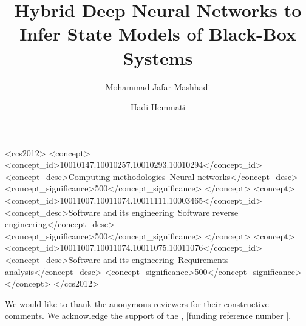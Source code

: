 \documentclass[sigconf]{acmart}
\begin{document}
\title{Hybrid Deep Neural Networks to Infer State Models of Black-Box Systems}

\author{Mohammad Jafar Mashhadi}

\author{Hadi Hemmati}


\begin{CCSXML}
<ccs2012>
   <concept>
       <concept_id>10010147.10010257.10010293.10010294</concept_id>
       <concept_desc>Computing methodologies~Neural networks</concept_desc>
       <concept_significance>500</concept_significance>
       </concept>
   <concept>
       <concept_id>10011007.10011074.10011111.10003465</concept_id>
       <concept_desc>Software and its engineering~Software reverse engineering</concept_desc>
       <concept_significance>500</concept_significance>
       </concept>
   <concept>
       <concept_id>10011007.10011074.10011075.10011076</concept_id>
       <concept_desc>Software and its engineering~Requirements analysis</concept_desc>
       <concept_significance>500</concept_significance>
       </concept>
 </ccs2012>
\end{CCSXML}





\maketitle








\begin{acks}
We would like to thank the anonymous reviewers for their constructive comments.
We acknowledge the support of the , [funding reference number ].
\end{acks}



\end{document}
